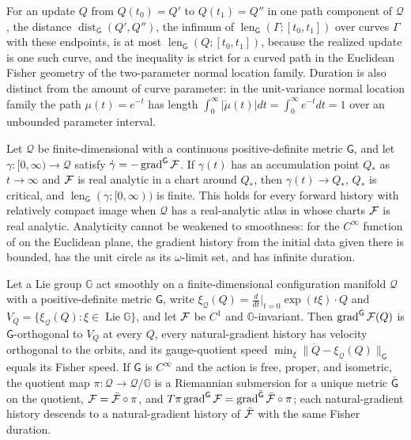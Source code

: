 For an update $Q$ from $Q(t_0)=Q'$ to $Q(t_1)=Q''$ in one path component of
$\mathcal Q$, the distance $\operatorname{dist}_{\mathsf G}(Q',Q'')$, the infimum of
$\operatorname{len}_{\mathsf G}(\Gamma;[t_0,t_1])$ over curves $\Gamma$ with these
endpoints, is at most $\operatorname{len}_{\mathsf G}(Q;[t_0,t_1])$, because the realized
update is one such curve, and the inequality is strict for a curved path in the Euclidean
Fisher geometry of the two-parameter normal location family.  Duration is also distinct
from the amount of curve parameter: in the unit-variance normal location family the path
$\mu(t)=e^{-t}$ has length $\int_0^\infty|\dot\mu(t)|dt=\int_0^\infty e^{-t}dt=1$ over an
unbounded parameter interval.  

Let $\mathcal Q$ be finite-dimensional with a continuous positive-definite metric
$\mathsf G$, and let $\gamma:[0,\infty)\to\mathcal Q$ satisfy
$\dot\gamma=-\operatorname{grad}^{\mathsf G}\mathcal F$.  If $\gamma(t)$ has an
accumulation point $Q_*$ as $t\to\infty$ and $\mathcal F$ is real analytic in a chart
around $Q_*$, then $\gamma(t)\to Q_*$, $Q_*$ is critical, and
$\operatorname{len}_{\mathsf G}(\gamma;[0,\infty))$ is finite.  This holds for every
forward history with relatively compact image when $\mathcal Q$ has a real-analytic atlas
in whose charts $\mathcal F$ is real analytic.  Analyticity cannot be weakened to
smoothness: for the $C^\infty$ function of \citet[Section~2, Eq.~(8)]{absil2005convergence}
on the Euclidean plane, the gradient history from the initial data given there is
bounded, has the unit circle as its $\omega$-limit set, and has infinite duration.

Let a Lie group $\mathbb G$ act smoothly on a finite-dimensional configuration manifold
$\mathcal Q$ with a positive-definite metric $\mathsf G$, write
$\xi_{\mathcal Q}(Q)=\tfrac{d}{dt}\big|_{t=0}\exp(t\xi)\cdot Q$ and
$V_Q=\{\xi_{\mathcal Q}(Q):\xi\in\operatorname{Lie}\mathbb G\}$, and let $\mathcal F$ be
$C^1$ and $\mathbb G$-invariant.  Then $\operatorname{grad}^{\mathsf G}\mathcal F(Q)$ is
$\mathsf G$-orthogonal to $V_Q$ at every $Q$, every natural-gradient history has velocity
orthogonal to the orbits, and its gauge-quotient speed
$\min_{\xi}\lVert\dot Q-\xi_{\mathcal Q}(Q)\rVert_{\mathsf G}$ equals its Fisher speed.
If $\mathsf G$ is $C^\infty$ and the action is free, proper, and isometric, the quotient
map $\pi:\mathcal Q\to\mathcal Q/\mathbb G$ is a Riemannian submersion for a unique
metric $\bar{\mathsf G}$ on the quotient, $\mathcal F=\bar{\mathcal F}\circ\pi$, and
$T\pi\operatorname{grad}^{\mathsf G}\mathcal F=\operatorname{grad}^{\bar{\mathsf
G}}\bar{\mathcal F}\circ\pi$; each natural-gradient history descends to a natural-gradient
history of $\bar{\mathcal F}$ with the same Fisher duration.  

